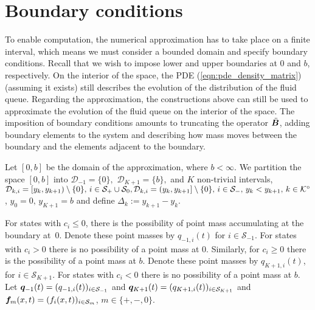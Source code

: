 \section{Boundary conditions}\label{subsec: boundary DG}
To enable computation, the numerical approximation has to take place on a finite interval, which means we must consider a bounded domain and specify boundary conditions. Recall that we wish to impose lower and upper boundaries at \(0\) and \(b\), respectively. On the interior of the space, the PDE (\ref{eqn:pde_density_matrix}) (assuming it exists) still describes the evolution of the distribution of the fluid queue. Regarding the approximation, the constructions above can still be used to approximate the evolution of the fluid queue on the interior of the space. The imposition of boundary conditions amounts to truncating the operator \(\ddot{\boldsymbol B}\), adding boundary elements to the system and describing how mass moves between the boundary and the elements adjacent to the boundary.  %

Let $[0,b]$ be the domain of the approximation, where $b < \infty$. We partition the space $[0,b]$ into \(\mathcal D_{-1}=\{0\},\) \(\mathcal D_{K+1}=\{b\},\) and \(K\) non-trivial intervals, \(\mathcal{D}_{k,i}=[y_k,y_{k+1})\setminus \{0\},\,i\in\mathcal{S}_+\cup\mathcal{S}_0,\mathcal{D}_{k,i}=(y_k,y_{k+1}]\setminus \{0\},\,i\in\mathcal{S}_-,\, y_k<y_{k+1},\, k\in\mathcal K^\circ\), \(y_0=0,\,y_{K+1}=b\) and define \(\Delta_k := y_{k+1}-y_k\). 

For states with \(c_i\leq 0\), there is the possibility of point mass accumulating at the boundary at~\(0\). Denote these point masses by \(q_{{-1},i}(t)\) for \(i\in\mathcal S_{-1}\). For states with \(c_i>0\) there is no possibility of a point mass at \(0\). Similarly, for \(c_i\geq 0\) there is the possibility of a point mass at \(b\). Denote these point masses by \(q_{{K+1},i}(t)\), for \(i\in\mathcal S_{K+1}\). For states with \(c_i<0\) there is no possibility of a point mass at \(b\). Let \(\boldsymbol q_{-1}(t)=(q_{{-1},i}(t))_{i\in\mathcal{S}_{-1}}\) and \(\boldsymbol q_{K+1}(t) = (q_{{K+1},i}(t))_{i\in\mathcal{S}_{K+1}}\) and \(\boldsymbol f_m(x,t) = (f_i(x,t))_{i\in\mathcal{S}_m}\), \(m\in\{+,-,0\}\). 

